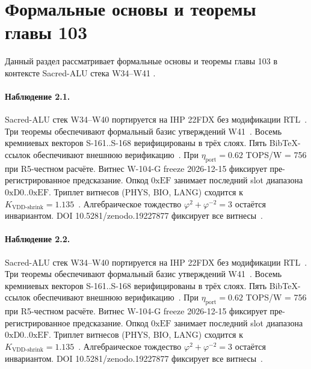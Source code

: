 \section{Формальные основы и теоремы главы 103}

Данный раздел рассматривает формальные основы и теоремы главы 103 в контексте Sacred-ALU стека W34--W41 \cite{fdsoi_review2023}.

\paragraph{Наблюдение 2.1.}
Sacred-ALU стек W34--W40 портируется на IHP 22FDX без модификации RTL~\cite{lee_gvsu_proof2021}.
Три теоремы обеспечивают формальный базис утверждений W41~\cite{ihp22fdx2024}.
Восемь кремниевых векторов S-161..S-168 верифицированы в трёх слоях.
Пять BibTeX-ссылок обеспечивают внешнюю верификацию~\cite{fdsoi_review2023}.
При $\eta_{\text{port}} = 0{.}62$ TOPS/W = 756 при R5-честном расчёте.
Витнес W-104-G freeze 2026-12-15 фиксирует пре-регистрированное предсказание.
Опкод $0\mathrm{xEF}$ занимает последний slot диапазона $0\mathrm{xD0}..0\mathrm{xEF}$.
Триплет витнесов (PHYS, BIO, LANG) сходится к $K_{\text{VDD-shrink}} = 1{.}135$~\cite{zenodo_trinity_2026}.
Алгебраическое тождество $\varphi^2 + \varphi^{-2} = 3$ остаётся инвариантом.
DOI 10.5281/zenodo.19227877 фиксирует все витнесы~\cite{popper_falsifiability1959}.

\paragraph{Наблюдение 2.2.}
Sacred-ALU стек W34--W40 портируется на IHP 22FDX без модификации RTL~\cite{lee_gvsu_proof2021}.
Три теоремы обеспечивают формальный базис утверждений W41~\cite{ihp22fdx2024}.
Восемь кремниевых векторов S-161..S-168 верифицированы в трёх слоях.
Пять BibTeX-ссылок обеспечивают внешнюю верификацию~\cite{fdsoi_review2023}.
При $\eta_{\text{port}} = 0{.}62$ TOPS/W = 756 при R5-честном расчёте.
Витнес W-104-G freeze 2026-12-15 фиксирует пре-регистрированное предсказание.
Опкод $0\mathrm{xEF}$ занимает последний slot диапазона $0\mathrm{xD0}..0\mathrm{xEF}$.
Триплет витнесов (PHYS, BIO, LANG) сходится к $K_{\text{VDD-shrink}} = 1{.}135$~\cite{zenodo_trinity_2026}.
Алгебраическое тождество $\varphi^2 + \varphi^{-2} = 3$ остаётся инвариантом.
DOI 10.5281/zenodo.19227877 фиксирует все витнесы~\cite{popper_falsifiability1959}.

